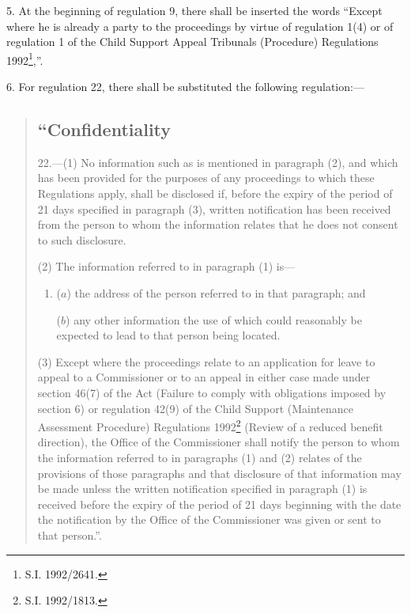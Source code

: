 \documentclass[12pt,a4paper]{article}
\begin{document}
\medskip

5.  At the beginning of regulation 9, there shall be inserted the words “Except where he is already a party to the proceedings by virtue of regulation 1(4) or of regulation 1 of the Child Support Appeal Tribunals (Procedure) Regulations 1992\footnote{\frenchspacing S.I. 1992/2641.},”.

\medskip

6.  For regulation 22, there shall be substituted the following regulation:—
\begin{quotation}
\subsection*{“Confidentiality}

22.—(1) No information such as is mentioned in paragraph (2), and which has been provided for the purposes of any proceedings to which these Regulations apply, shall be disclosed if, before the expiry of the period of 21 days specified in paragraph (3), written notification has been received from the person to whom the information relates that he does not consent to such disclosure.

(2) The information referred to in paragraph (1) is—
\begin{enumerate}\item[]
($a$) the address of the person referred to in that paragraph; and

($b$) any other information the use of which could reasonably be expected to lead to that person being located.
\end{enumerate}

(3) Except where the proceedings relate to an application for leave to appeal to a Commissioner or to an appeal in either case made under section 46(7) of the Act (Failure to comply with obligations imposed by section 6) or regulation 42(9) of the Child Support (Maintenance Assessment Procedure) Regulations 1992\footnote{\frenchspacing S.I. 1992/1813.} (Review of a reduced benefit direction), the Office of the Commissioner shall notify the person to whom the information referred to in paragraphs (1) and (2) relates of the provisions of those paragraphs and that disclosure of that information may be made unless the written notification specified in paragraph (1) is received before the expiry of the period of 21 days beginning with the date the notification by the Office of the Commissioner was given or sent to that person.”.
\end{quotation}
\end{document}

